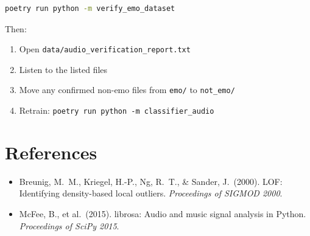 \documentclass[11pt,a4paper]{article}
\begin{document}
\begin{lstlisting}[language=bash]
poetry run python -m verify_emo_dataset
\end{lstlisting}

Then:
\begin{enumerate}
  \item Open \texttt{data/audio\_verification\_report.txt}
  \item Listen to the listed files
  \item Move any confirmed non-emo files from \texttt{emo/} to \texttt{not\_emo/}
  \item Retrain: \texttt{poetry run python -m classifier\_audio}
\end{enumerate}

\section{References}

\begin{itemize}
  \item Breunig, M.\ M., Kriegel, H.-P., Ng, R.\ T., \& Sander, J.\ (2000). LOF: Identifying density-based local outliers. \textit{Proceedings of SIGMOD 2000}.
  \item McFee, B., et al.\ (2015). librosa: Audio and music signal analysis in Python. \textit{Proceedings of SciPy 2015}.
\end{itemize}
\end{document}
